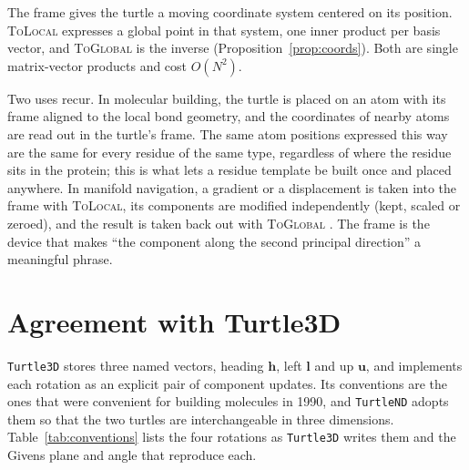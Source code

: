 \documentclass[11pt,letterpaper]{article}
\newcommand{\code}[1]{\texttt{#1}}
\newcommand{\op}[1]{\textup{\textsc{#1}}}
\begin{document}
The frame gives the turtle a moving coordinate system centered on its
position. \op{ToLocal} expresses a global point in that system, one
inner product per basis vector, and \op{ToGlobal} is the inverse
(Proposition~\ref{prop:coords}). Both are single matrix-vector products
and cost $O(N^2)$.

Two uses recur. In molecular building, the turtle is placed on an atom
with its frame aligned to the local bond geometry, and the coordinates
of nearby atoms are read out in the turtle's frame. The same atom
positions expressed this way are the same for every residue of the same
type, regardless of where the residue sits in the protein; this is what
lets a residue template be built once and placed anywhere. In manifold
navigation, a gradient or a displacement is taken into the frame with
\op{ToLocal}, its components are modified independently (kept,
scaled or zeroed), and the result is taken back out with
\op{ToGlobal} \citep{suchanek2026waverider}. The frame is the
device that makes ``the component along the second principal direction''
a meaningful phrase.

\section{Agreement with Turtle3D}
\label{sec:compat}

\code{Turtle3D} stores three named vectors, heading $\mathbf{h}$, left
$\mathbf{l}$ and up $\mathbf{u}$, and implements each rotation as an
explicit pair of component updates. Its conventions are the ones that
were convenient for building molecules in 1990, and \code{TurtleND}
adopts them so that the two turtles are interchangeable in three
dimensions. Table~\ref{tab:conventions} lists the four rotations as
\code{Turtle3D} writes them and the Givens plane and angle that
reproduce each.
\end{document}
